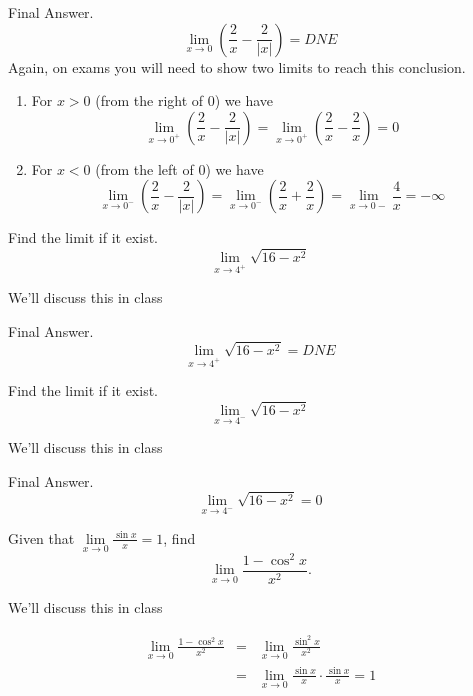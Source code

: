 \documentclass[12pt,addpoints, answers, fleqn]{exam}
\begin{document}
\begin{questions}
\begin{solution}
Final Answer.
\[
\mathop {\lim }\limits_{x \to 0}  \left( \frac{2}{x} - \frac{2}{\left| x \right|} \right)=DNE
\]
Again, on exams you will need to show two limits to reach this conclusion.
\begin{enumerate}
\item For $x > 0$ (from the right of $0$) we have
\[
\mathop {\lim }\limits_{x \to 0^+}  \left( \frac{2}{x} - \frac{2}{\left| x \right|} \right) = \mathop {\lim }\limits_{x \to 0^+}  \left( \frac{2}{x} - \frac{2}{ x } \right) = 0 
\]
\item For $x < 0$ (from the left of $0$) we have
\[
\mathop {\lim }\limits_{x \to 0^-}  \left( \frac{2}{x} - \frac{2}{\left| x \right|} \right) = \mathop {\lim }\limits_{x \to 0^-}  \left( \frac{2}{x} + \frac{2}{ x } \right) =  \mathop {\lim }\limits_{x \to 0-}   \frac{4}{x} = - \infty
\]
\end{enumerate}
\end{solution}

\question Find the limit if it exist.
\[
\mathop {\lim }\limits_{x \to 4^+}  \sqrt{16-x^2}
\]

\begin{solution}
We'll discuss this in class

Final Answer.
\[
\mathop {\lim }\limits_{x \to 4^+}  \sqrt{16-x^2} = DNE
\]
\end{solution}

\question Find the limit if it exist.
\[
\mathop {\lim }\limits_{x \to 4^-}  \sqrt{16-x^2}
\]

\begin{solution}
We'll discuss this in class

Final Answer.
\[
\mathop {\lim }\limits_{x \to 4^-}  \sqrt{16-x^2} = 0
\]
\end{solution}

\question Given that $\displaystyle  \mathop {\lim }\limits_{x \to 0}  \frac{\sin x}{x} = 1$,
find
\[
\mathop {\lim }\limits_{x \to 0}  \frac{1 - \cos^2 x}{x^2}.
\]

\begin{solution}
We'll discuss this in class


\begin{eqnarray*}
\lim_{x \to 0}  \frac{1 - \cos^2 x}{x^2} &=& \lim_{x \to 0}  \frac{\sin^2 x}{x^2}\\
&=& \lim_{x \to 0}  \frac{\sin x}{x} \cdot \frac{\sin x}{x} =1
\end{eqnarray*}

\end{solution}

\end{questions}
\end{document}

